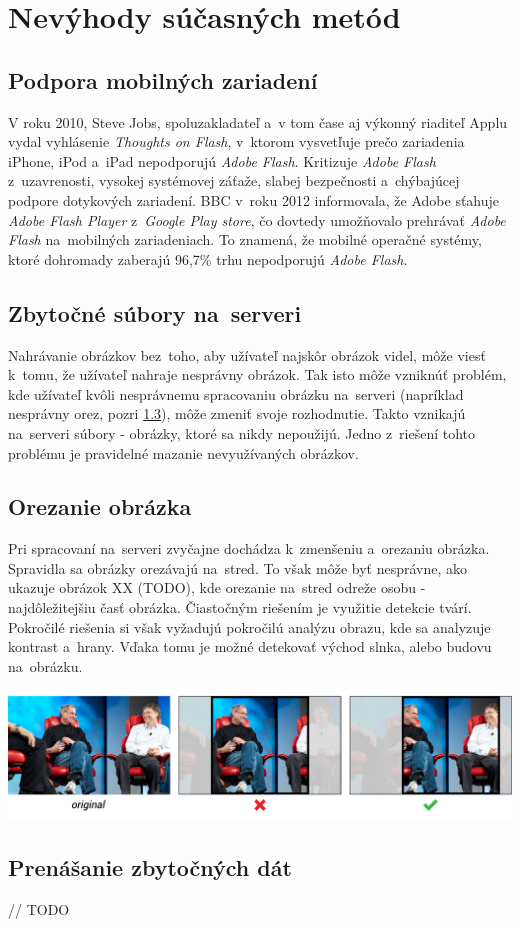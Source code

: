 \graphicspath{ {img/23/} }

\chapter{Nevýhody súčasných metód}
\section{Podpora mobilných zariadení}
\label{sec:mobile-support}

V roku 2010, Steve Jobs, spoluzakladateľ a~v tom čase aj výkonný riaditeľ Applu vydal vyhlásenie \emph{Thoughts on Flash}\cite{Apple_flash}, v~ktorom vysvetľuje prečo zariadenia iPhone, iPod a~iPad nepodporujú \emph{Adobe Flash}. Kritizuje \emph{Adobe Flash} z~uzavrenosti, vysokej systémovej záťaže, slabej bezpečnosti a~chýbajúcej podpore dotykových zariadení.
BBC v~roku 2012 informovala\cite{Android_flash}, že Adobe sťahuje \emph{Adobe Flash Player} z~\emph{Google Play store}, čo dovtedy umožňovalo prehrávať \emph{Adobe Flash} na~mobilných zariadeniach. To znamená, že mobilné operačné systémy, ktoré dohromady zaberajú 96,7\% trhu\cite{Mobile_OS_share} nepodporujú \emph{Adobe Flash}.


\section{Zbytočné súbory na~serveri}

Nahrávanie obrázkov bez~toho, aby užívateľ najskôr obrázok videl, môže viesť k~tomu, že užívateľ nahraje nesprávny obrázok. Tak isto môže vzniknúť problém, kde užívateľ kvôli nesprávnemu spracovaniu obrázku na~serveri (napríklad nesprávny orez, pozri \ref{sec:orezanie-obrazka}), môže zmeniť svoje rozhodnutie. Takto vznikajú na~serveri súbory - obrázky, ktoré sa nikdy nepoužijú. Jedno z~riešení tohto problému je pravidelné mazanie nevyužívaných obrázkov.   

\section{Orezanie obrázka}
\label{sec:orezanie-obrazka}

Pri spracovaní na~serveri zvyčajne dochádza k~zmenšeniu a~orezaniu obrázka. Spravidla sa obrázky orezávajú na~stred. To však môže byť nesprávne, ako ukazuje obrázok XX (TODO), kde orezanie na~stred odreže osobu - najdôležitejšiu časť obrázka. Čiastočným riešením je využitie detekcie tvárí. Pokročilé riešenia si však vyžadujú pokročilú analýzu obrazu, kde sa analyzuje kontrast a~hrany. Vďaka tomu je možné detekovať východ slnka, alebo budovu na~obrázku. 

\includegraphics[width=\textwidth]{jobs_gates}

\section{Prenášanie zbytočných dát}

// TODO